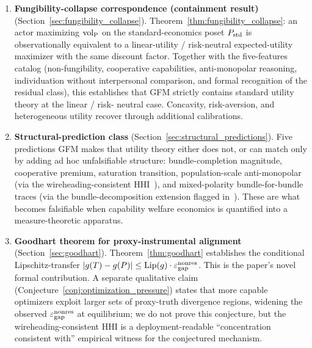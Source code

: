 \begin{enumerate}
\item \textbf{Fungibility-collapse correspondence (containment result)}
  (Section~\ref{sec:fungibility_collapse}).
  Theorem~\ref{thm:fungibility_collapse}: an actor maximizing
  ${\operatorname{vol}_{\mathrm{P}}}$ on the standard-economics poset $P_{\mathrm{std}}$ is
  observationally equivalent to a linear-utility / risk-neutral
  expected-utility maximizer with the same discount factor.
  Together with the five-features catalog (non-fungibility,
  cooperative capabilities, anti-monopolar reasoning,
  individuation without interpersonal comparison, and formal
  recognition of the residual class), this establishes that GFM
  strictly contains standard utility theory at the linear / risk-
  neutral case.  Concavity, risk-aversion, and heterogeneous
  utility recover through additional calibrations.

\item \textbf{Structural-prediction class}
  (Section~\ref{sec:structural_predictions}).  Five predictions
  GFM makes that utility theory either does not, or can match
  only by adding ad hoc unfalsifiable structure: bundle-completion
  magnitude, cooperative premium, saturation transition,
  population-scale anti-monopolar (via the
  wireheading-consistent
  HHI~\citep[Proposition~6]{lasser2026paper8b}), and
  mixed-polarity bundle-for-bundle traces (via the
  bundle-decomposition extension flagged
  in~\citep[Open~Question~2]{lasser2026paper8a}).  These are what
  becomes falsifiable when capability welfare economics is
  quantified into a measure-theoretic apparatus.

\item \textbf{Goodhart theorem for proxy-instrumental alignment}
  (Section~\ref{sec:goodhart}).
  Theorem~\ref{thm:goodhart} establishes the conditional
  Lipschitz-transfer
  $|g(T) - g(P)| \leq \mathrm{Lip}(g) \cdot \varepsilon_{\mathrm{gap}}^{\mathrm{nonres}}$.  This
  is the paper's novel formal contribution.  A separate
  qualitative claim (Conjecture~\ref{conj:optimization_pressure})
  states that more capable optimizers exploit larger sets of
  proxy-truth divergence regions, widening the observed
  $\varepsilon_{\mathrm{gap}}^{\mathrm{nonres}}$ at equilibrium; we do not prove this conjecture,
  but the wireheading-consistent HHI is a deployment-readable
  ``concentration consistent with'' empirical witness for the
  conjectured mechanism.


\end{enumerate}

